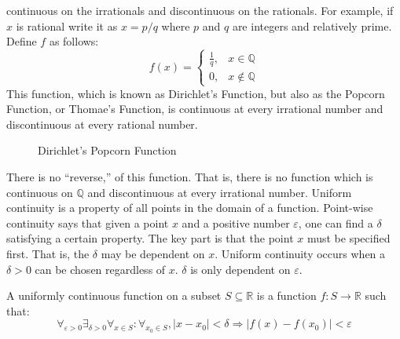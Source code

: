             continuous on the irrationals and discontinuous
            on the rationals. For example, if $x$ is
            rational write it as $x=p/q$ where $p$ and
            $q$ are integers and relatively prime. Define $f$
            as follows:
            \begin{equation}
                f(x)=
                \begin{cases}
                    \frac{1}{q},&x\in\mathbb{Q}\\
                    0,&x\notin\mathbb{Q}
                \end{cases}
            \end{equation}
            This function, which is known as Dirichlet's Function, but also as
            the Popcorn Function, or Thomae's Function, is continuous at every
            irrational number and discontinuous at every rational number.
            \begin{figure}[H]
                \captionsetup{type=figure}
                \centering
                
                \caption{Dirichlet's Popcorn Function}
                \label{fig:Dirichlet_Thomae_Function}
            \end{figure}
            There is no ``reverse,'' of this
            function. That is, there is no function which is
            continuous on $\mathbb{Q}$ and discontinuous at
            every irrational number. Uniform continuity is a
            property of all points in the domain of a function.
            Point-wise continuity says that given a point $x$
            and a positive number
            $\varepsilon$, one can find a $\delta$ satisfying a
            certain property. The key part is that the point $x$ must
            be specified first. That is, the $\delta$
            may be dependent on $x$.
            Uniform continuity occurs when a $\delta>0$ can be
            chosen regardless of $x$. $\delta$ is
            only dependent on $\varepsilon$.
            \begin{definition}
                A uniformly continuous function on a subset
                $S\subseteq\mathbb{R}$
                is a function $f:S\rightarrow\mathbb{R}$ such that:
                \begin{equation*}
                    \forall_{\varepsilon>0}\exists_{\delta>0}
                    \forall_{x\in{S}}:\forall_{x_{0}\in{S}},
                    |x-x_{0}|<\delta
                    \Rightarrow|f(x)-f(x_{0})|<\varepsilon    
                \end{equation*}
            \end{definition}
